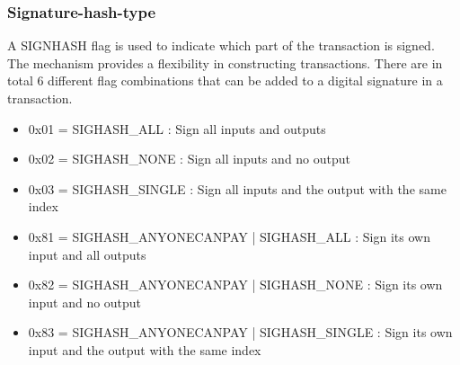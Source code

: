 \subsubsection{Signature-hash-type}

A SIGNHASH \cite{website:signhash} flag is used to indicate which part of the transaction is signed. 
The mechanism provides a flexibility in constructing transactions. 
There are in total 6 different flag combinations that can be added to a digital signature in a transaction. 

\begin{itemize}
    \item 0x01 = SIGHASH\_ALL : Sign all inputs and outputs
    \item 0x02 = SIGHASH\_NONE : Sign all inputs and no output
    \item 0x03 = SIGHASH\_SINGLE : Sign all inputs and the output with the same index
    \item 0x81 = SIGHASH\_ANYONECANPAY | SIGHASH\_ALL : Sign its own input and all outputs
    \item 0x82 = SIGHASH\_ANYONECANPAY | SIGHASH\_NONE : Sign its own input and no output
    \item 0x83 = SIGHASH\_ANYONECANPAY | SIGHASH\_SINGLE : Sign its own input and the output with the same index
\end{itemize}
